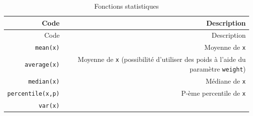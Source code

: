 \documentclass[12pt,]{book}
\numberwithin{equation}{section}
\numberwithin{countremarque}{section}
\begin{document}
\begin{longtable}[]{@{}rr@{}}
\caption{\label{tab:numpy-stats-fonctions} Fonctions
statistiques}\tabularnewline
\toprule
\begin{minipage}[b]{0.18\columnwidth}\raggedleft\strut
Code\strut
\end{minipage} & \begin{minipage}[b]{0.71\columnwidth}\raggedleft\strut
Description\strut
\end{minipage}\tabularnewline
\midrule
\endfirsthead
\toprule
\begin{minipage}[b]{0.18\columnwidth}\raggedleft\strut
Code\strut
\end{minipage} & \begin{minipage}[b]{0.71\columnwidth}\raggedleft\strut
Description\strut
\end{minipage}\tabularnewline
\midrule
\endhead
\begin{minipage}[t]{0.18\columnwidth}\raggedleft\strut
\texttt{mean(x)}\strut
\end{minipage} & \begin{minipage}[t]{0.71\columnwidth}\raggedleft\strut
Moyenne de \texttt{x}\strut
\end{minipage}\tabularnewline
\begin{minipage}[t]{0.18\columnwidth}\raggedleft\strut
\texttt{average(x)}\strut
\end{minipage} & \begin{minipage}[t]{0.71\columnwidth}\raggedleft\strut
Moyenne de \texttt{x} (possibilité d'utiliser des poids à l'aide du
paramètre \texttt{weight})\strut
\end{minipage}\tabularnewline
\begin{minipage}[t]{0.18\columnwidth}\raggedleft\strut
\texttt{median(x)}\strut
\end{minipage} & \begin{minipage}[t]{0.71\columnwidth}\raggedleft\strut
Médiane de \texttt{x}\strut
\end{minipage}\tabularnewline
\begin{minipage}[t]{0.18\columnwidth}\raggedleft\strut
\texttt{percentile(x,p)}\strut
\end{minipage} & \begin{minipage}[t]{0.71\columnwidth}\raggedleft\strut
P-ème percentile de \texttt{x}\strut
\end{minipage}\tabularnewline
\begin{minipage}[t]{0.18\columnwidth}\raggedleft\strut
\texttt{var(x)}\strut
\end{minipage} & \begin{minipage}[t]{0.71\columnwidth}\raggedleft\strut

\end{minipage}
\end{longtable}
\end{document}
